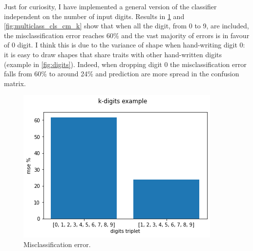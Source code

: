 \documentclass[a4paper,10pt]{report}
\begin{document}
Just for curiosity, I have implemented a general version of the classifier independent on the number of input digits. 
Results in \ref{fig:k_multiclass_cls_mse} and \ref{fig:multiclass_cls_cm_k} show that when all the digit, from 0 to 9, are included, the misclassification error reaches 60\% and the vast majority of errors is in favour of 0 digit.
I think this is due to the variance of shape when hand-writing digit 0: it is easy to draw shapes that share traits with other hand-written digits (example in \ref{fig:digits}).
Indeed, when dropping digit 0 the misclassification error falls from 60\% to around 24\% and prediction are more spread in the confusion matrix.
\begin{figure}[h]
  \center
  \includegraphics[width=0.45\linewidth]{k_multiclass_cls_mse.png}
  \caption{Misclassification error.}
  \label{fig:k_multiclass_cls_mse}
\end{figure}
\end{document}
